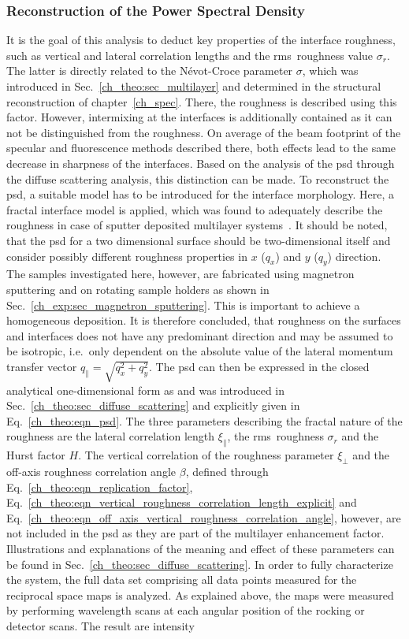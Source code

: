 \subsubsection{Reconstruction of the Power Spectral Density}
It is the goal of this analysis to deduct key properties of the interface roughness, such as vertical and lateral correlation lengths and the \gls{rms}~roughness value $\sigma_r$. The latter is directly related to the N\'{e}vot-Croce parameter $\sigma$, which was introduced in Sec.~\ref{ch_theo:sec_multilayer} and determined in the structural reconstruction of chapter~\ref{ch_spec}. There, the roughness is described using this factor. However, intermixing at the interfaces is additionally contained as it can not be distinguished from the roughness. On average of the beam footprint of the specular and fluorescence methods described there, both effects lead to the same decrease in sharpness of the interfaces. Based on the analysis of the \gls{psd} through the diffuse scattering analysis, this distinction can be made. To reconstruct the \gls{psd}, a suitable model has to be introduced for the interface morphology. Here, a fractal interface model is applied, which was found to adequately describe the roughness in case of sputter deposited multilayer systems~\cite{de_boer_X-ray_1995, de_boer_X-ray_1996, sinha_X-ray_1988}. It should be noted, that the \gls{psd} for a two dimensional surface should be two-dimensional itself and consider possibly different roughness properties in $x$ ($q_x$) and $y$ ($q_y$) direction. The samples investigated here, however, are fabricated using magnetron sputtering and on rotating sample holders as shown in Sec.~\ref{ch_exp:sec_magnetron_sputtering}. This is important to achieve a homogeneous deposition. It is therefore concluded, that roughness on the surfaces and interfaces does not have any predominant direction and may be assumed to be isotropic, i.e.~only dependent on the absolute value of the lateral momentum transfer vector $q_\parallel = \sqrt{q_x^2+q_y^2}$. The \gls{psd} can then be expressed in the closed analytical one-dimensional form as and was introduced in Sec.~\ref{ch_theo:sec_diffuse_scattering} and explicitly given in Eq.~\eqref{ch_theo:eqn_psd}. The three parameters describing the fractal nature of the roughness are the lateral correlation length $\xi_\parallel$, the \gls{rms}~roughness $\sigma_r$ and the Hurst factor $H$. The vertical correlation of the roughness parameter $\xi_\perp$ and the off-axis roughness correlation angle $\beta$, defined through Eq.~\eqref{ch_theo:eqn_replication_factor}, Eq.~\eqref{ch_theo:eqn_vertical_roughness_correlation_length_explicit} and Eq.~\eqref{ch_theo:eqn_off_axis_vertical_roughness_correlation_angle}, however, are not included in the \gls{psd} as they are part of the multilayer enhancement factor. Illustrations and explanations of the meaning and effect of these parameters can be found in Sec.~\ref{ch_theo:sec_diffuse_scattering}. In order to fully characterize the system, the full data set comprising all data points measured for the reciprocal space maps is analyzed. As explained above, the maps were measured by performing wavelength scans at each angular position of the rocking or detector scans. The result are intensity 